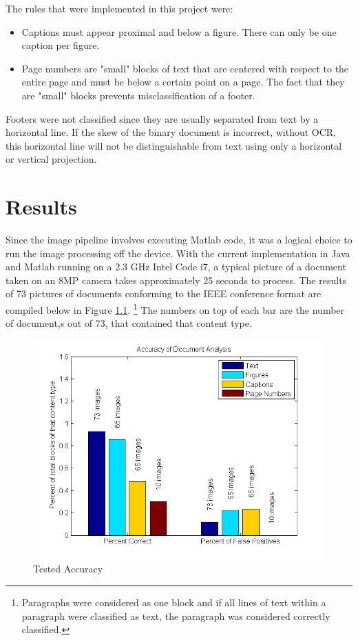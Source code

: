 \documentclass{report}
\begin{document}
The rules that were implemented in this project were:

\begin{itemize}
\item Captions must appear proximal and below a figure. There can only be one caption per figure.
\item Page numbers are "small" blocks of text that are centered with respect to the entire page and must be below a certain point on a page. The fact that they are "small" blocks prevents misclassification of a footer.
\end{itemize}

Footers were not classified since they are usually separated from text by a horizontal line. If the skew of the binary document is incorrect, without OCR, this horizontal line will not be distinguishable from text using only a horizontal or vertical projection.

\chapter{Results}
Since the image pipeline involves executing Matlab code, it was a logical choice to run the image processing off the device. With the current implementation in Java and Matlab running on a 2.3 GHz Intel Code i7, a typical picture of a document taken on an 8MP camera takes approximately 25 seconds to process. The results of 73 pictures of documents conforming to the IEEE conference format are compiled below in Figure \ref{accuracy}. \footnote{Paragraphs were considered as one block and if all lines of text within a paragraph were classified as text, the paragraph was considered correctly classified.} The numbers on top of each bar are the number of document,s out of 73, that contained that content type.
\begin{figure}[h]
\centering
\includegraphics[width = 0.8\columnwidth]{accuracy_report2.png}
\caption{Tested Accuracy}
\label{accuracy}
\end{figure}
\end{document}
